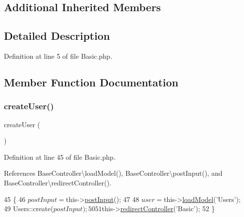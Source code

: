 \subsection*{Additional Inherited Members}


\subsection{Detailed Description}


Definition at line 5 of file Basic.\+php.



\subsection{Member Function Documentation}
\hypertarget{class_basic_a967982ee98f05287bbdba812f6016947}{}\label{class_basic_a967982ee98f05287bbdba812f6016947} 
\subsubsection{\texorpdfstring{create\+User()}{createUser()}}
{\footnotesize\ttfamily create\+User (\begin{DoxyParamCaption}{ }\end{DoxyParamCaption})}



Definition at line 45 of file Basic.\+php.



References Base\+Controller\textbackslash{}load\+Model(), Base\+Controller\textbackslash{}post\+Input(), and Base\+Controller\textbackslash{}redirect\+Controller().


\begin{DoxyCode}
45                                  \{
46         $postInput = $this->\hyperlink{class_base_controller_a170629218b28c1759a89c4978b9323b3}{postInput}();
47 
48         $user = $this->\hyperlink{class_base_controller_a5fa8890bd3a9d20f5c0cc2377dc49eb1}{loadModel}(\textcolor{stringliteral}{'Users'});
49         Users::create($postInput);
50 
51         $this->\hyperlink{class_base_controller_a85ddb683efc64655be063b697f631beb}{redirectController}(\textcolor{stringliteral}{'Basic'});
52     \}
\end{DoxyCode}
\hypertarget{class_basic_a934aeeec370d904f3a58bde4d514259d}{}\label{class_basic_a934aeeec370d904f3a58bde4d514259d} 
